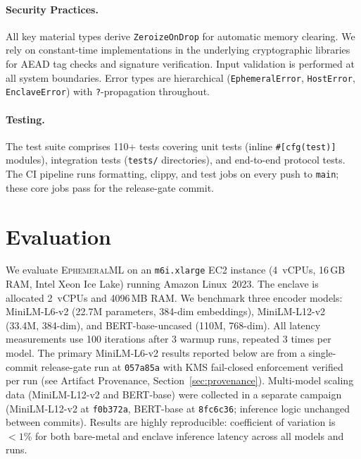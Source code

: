 \documentclass[11pt,a4paper]{article}
\newcommand{\BenchInstance}{m6i.xlarge}
\newcommand{\BenchModelName}{MiniLM-L6-v2}
\newcommand{\BenchModelParams}{22.7M}
\newcommand{\BenchNumRuns}{3}
\newcommand{\BenchCommit}{057a85a}
\newcommand{\ModelLTwelveParams}{33.4M}
\newcommand{\ModelBertBaseParams}{110M}
\begin{document}
\paragraph{Security Practices.}
All key material types derive \texttt{ZeroizeOnDrop} for automatic memory clearing.
We rely on constant-time implementations in the underlying cryptographic libraries for AEAD tag checks and signature verification.
Input validation is performed at all system boundaries.
Error types are hierarchical (\texttt{EphemeralError}, \texttt{HostError}, \texttt{EnclaveError}) with \texttt{?}-propagation throughout.

\paragraph{Testing.}
The test suite comprises 110+ tests covering unit tests (inline \texttt{\#[cfg(test)]} modules), integration tests (\texttt{tests/} directories), and end-to-end protocol tests.
The CI pipeline runs formatting, clippy, and test jobs on every push to \texttt{main}; these core jobs pass for the release-gate commit.

\section{Evaluation}
\label{sec:evaluation}

We evaluate \textsc{EphemeralML} on an \texttt{\BenchInstance{}} EC2 instance (4~vCPUs, 16\,GB RAM, Intel Xeon Ice Lake) running Amazon Linux~2023.
The enclave is allocated 2~vCPUs and 4096\,MB RAM.
We benchmark three encoder models: \BenchModelName{} (\BenchModelParams{} parameters, 384-dim embeddings), MiniLM-L12-v2 (\ModelLTwelveParams{}, 384-dim), and BERT-base-uncased (\ModelBertBaseParams{}, 768-dim).
All latency measurements use 100 iterations after 3 warmup runs, repeated \BenchNumRuns{} times per model.
The primary MiniLM-L6-v2 results reported below are from a single-commit release-gate run at \texttt{\BenchCommit{}} with KMS fail-closed enforcement verified per run (see Artifact Provenance, Section~\ref{sec:provenance}).
Multi-model scaling data (MiniLM-L12-v2 and BERT-base) were collected in a separate campaign (MiniLM-L12-v2 at \texttt{f0b372a}, BERT-base at \texttt{8fc6c36}; inference logic unchanged between commits).
Results are highly reproducible: coefficient of variation is $< 1\%$ for both bare-metal and enclave inference latency across all models and runs.
\end{document}
